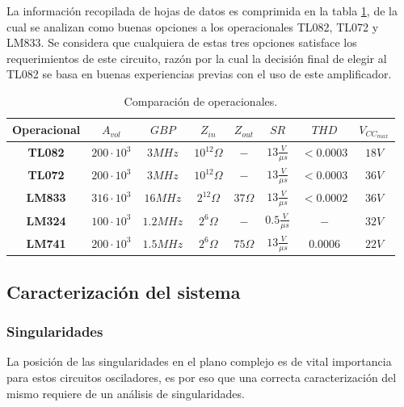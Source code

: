La información recopilada de hojas de datos es comprimida en la tabla \ref{tab:opamp_comparison_ex1}, de la cual se analizan como buenas opciones a los 
operacionales TL082, TL072 y LM833.
Se considera que cualquiera de estas tres opciones satisface los requerimientos de este circuito, razón por la cual la decisión final de elegir al TL082 
se basa en buenas experiencias previas con el uso de este amplificador.
\begin{table}[H]
    \centering
    \begin{tabular}{c|ccccccc}
    \textbf{Operacional} & \textbf{$A_{vol}$} & \textbf{$GBP$} & \textbf{$Z_{in}$} & \textbf{$Z_{out}$} & \textbf{$SR$}         & \textbf{$THD$} & \textbf{$V_{CC_{max}}$} \\ \hline
    \textbf{TL082}       & $200 \cdot 10^3$   & $3MHz$         & $10^12\Omega$     & $-$                & $13 \frac{V}{\mu s}$  & $< 0.0003$     & $18V$                   \\
    \textbf{TL072}       & $200 \cdot 10^3$   & $3MHz$         & $10^12\Omega$     & $-$                & $13 \frac{V}{\mu s}$  & $< 0.0003$     & $36V$                   \\
    \textbf{LM833}       & $316 \cdot 10^3$   & $16MHz$        & $2^12\Omega$      & $37\Omega$         & $13 \frac{V}{\mu s}$  & $< 0.0002$     & $36V$                   \\
    \textbf{LM324}       & $100 \cdot 10^3$   & $1.2MHz$       & $2^6\Omega$       & $-$                & $0.5 \frac{V}{\mu s}$ & $-$            & $32V$                   \\
    \textbf{LM741}       & $200 \cdot 10^3$   & $1.5MHz$       & $2^6\Omega$       & $75\Omega$         & $13 \frac{V}{\mu s}$  & $0.0006$       & $22V$                  
    \end{tabular}
    \caption{Comparación de operacionales.}
    \label{tab:opamp_comparison_ex1}
\end{table}



\subsection{Caracterización del sistema}
\subsubsection{Singularidades}
La posición de las singularidades en el plano complejo es de vital importancia para estos circuitos osciladores, es por eso que una correcta caracterización 
del mismo requiere de un análisis de singularidades.

